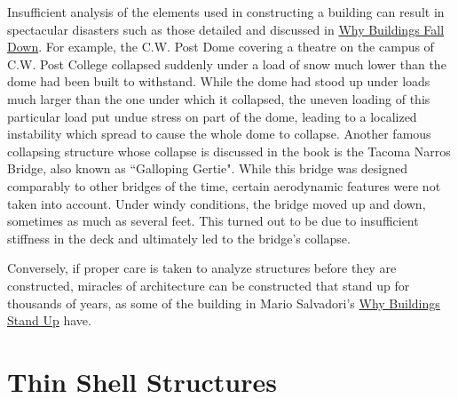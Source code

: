 \documentclass{thesis}
\begin{document}
Insufficient analysis of the elements used in constructing a building can result in spectacular disasters such as those
detailed and discussed in \underline{Why Buildings Fall Down}\cite{levy92falldown}.  For example, the C.W. Post Dome covering a theatre on the
campus of C.W. Post College collapsed suddenly under a load of snow much lower than the dome had been built to withstand.  While the dome had
stood up under loads much larger than the one under which it collapsed, the uneven loading of this particular load put undue stress on part
of the dome, leading to a localized instability which spread to cause the whole dome to collapse.  Another famous collapsing structure whose
collapse is discussed in the book is the Tacoma Narros Bridge, also known as ``Galloping Gertie".  While this bridge was designed comparably
to other bridges of the time, certain aerodynamic features were not taken into account.  Under windy conditions, the bridge moved up and down,
sometimes as much as several feet.  This turned out to be due to insufficient stiffness in the deck and ultimately led to the bridge's
collapse.

Conversely, if proper care is taken to analyze structures before they are constructed, miracles of architecture can be constructed that stand
up for thousands of years, as some of the building in Mario Salvadori's \underline{Why Buildings Stand Up}\cite{salvadori80standup} have.


\section{Thin Shell Structures} \label{thinshell}
\end{document}
